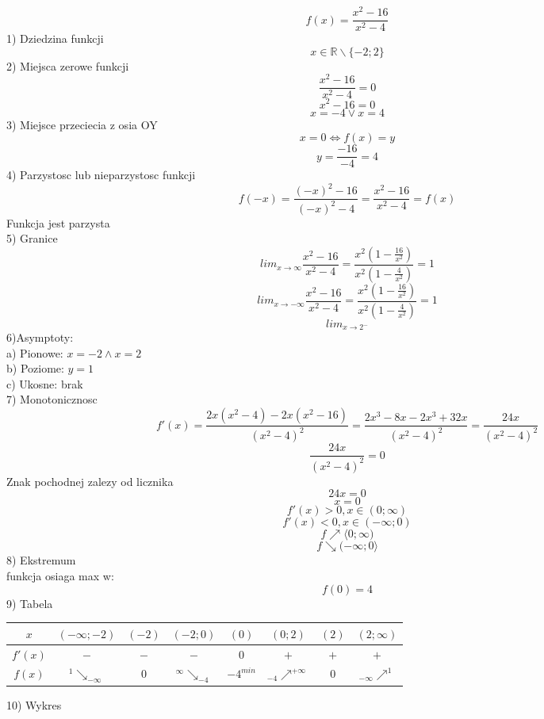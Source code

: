 \documentclass[12pt]{article}
\begin{document}
$$ f(x) = \frac {x^2-16}{x^2-4} $$
 1) Dziedzina  funkcji 
$$ x \in \mathbb{R} \backslash \{ -2;2 \}$$
2) Miejsca zerowe funkcji
$$ \frac {x^2-16}{x^2-4} = 0$$
$$ x^2 - 16 = 0$$
$$ x = -4 \vee x = 4$$
3) Miejsce przeciecia z osia OY
$$ x = 0 \Leftrightarrow f(x) = y$$
$$ y = \frac{-16}{-4} = 4$$
4) Parzystosc lub nieparzystosc funkcji \\
$$ f(-x) = \frac{(-x)^2-16}{(-x)^2-4} = \frac {x^2-16}{x^2-4} = f(x)$$ 
Funkcja jest parzysta\\
5) Granice
$$ lim _{x\to\infty} \frac {x^2-16}{x^2-4} = \frac{x^2(1-\frac{16}{x^2})}{x^2(1-\frac{4}{x^2})} = 1$$
$$ lim _{x\to-\infty} \frac {x^2-16}{x^2-4} = \frac{x^2(1-\frac{16}{x^2})}{x^2(1-\frac{4}{x^2})} = 1$$
$$ lim _{x\to2^-}$$
6)Asymptoty:\\
a) Pionowe: $ x=-2 \wedge x =2$\\
b) Poziome: $y = 1$\\
c) Ukosne: brak \\
7) Monotonicznosc
$$ f\prime(x) = \frac{2x(x^2-4)-2x(x^2-16)}{(x^2-4)^2} = \frac{2x^3-8x-2x^3+32x}{(x^2-4)^2} = \frac{24x}{(x^2-4)^2}$$
$$ \frac {24x}{(x^2-4)^2}= 0$$
Znak pochodnej zalezy od licznika
$$ 24x = 0$$
$$ x = 0$$
$$ f\prime(x) > 0, x \in (0; \infty)$$
$$ f\prime(x) < 0, x \in (-\infty; 0)$$
$$ f \nearrow \langle 0; \infty) $$
$$ f \searrow  ( -\infty; 0 \rangle $$
8) Ekstremum \\
funkcja osiaga max w:
$$ f(0) = 4$$
9) Tabela\\
\begin{center}
\begin{tabular}{ c | c | c | c | c | c | c | c}
 $x$ & $(-\infty;-2)$ & $(-2)$ & $(-2;0)$ & $(0)$ & $(0;2)$ & $(2)$ & $(2; \infty)$\\
 \hline
 $f\prime(x)$ & $-$ & $-$ & $-$ & $0$ & $+$ & $+$ &$+$\\
 \hline
 $f(x)$ & $^1\searrow_{-\infty}$ & $0$ & $^{\infty}\searrow_{-4}$ & $-4^{min}$ & $_{-4}\nearrow^{+\infty}$ & $0$ & $_{-\infty}\nearrow^1$\\    
\end{tabular}
\end{center}
10) Wykres\\
\end{document}

